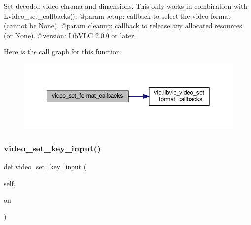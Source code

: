\begin{DoxyVerb}Set decoded video chroma and dimensions. This only works in combination with
L{video_set_callbacks}().
@param setup: callback to select the video format (cannot be None).
@param cleanup: callback to release any allocated resources (or None).
@version: LibVLC 2.0.0 or later.
\end{DoxyVerb}
 Here is the call graph for this function\+:
\nopagebreak
\begin{figure}[H]
\begin{center}
\leavevmode
\includegraphics[width=350pt]{classvlc_1_1_media_player_a4e34ac0318b11492555047b9d271a8d6_cgraph}
\end{center}
\end{figure}
\mbox{\label{classvlc_1_1_media_player_a1b21501a721f11e1adb9009442093707}} 
\subsubsection{\texorpdfstring{video\+\_\+set\+\_\+key\+\_\+input()}{video\_set\_key\_input()}}
{\footnotesize\ttfamily def video\+\_\+set\+\_\+key\+\_\+input (\begin{DoxyParamCaption}\item[{}]{self,  }\item[{}]{on }\end{DoxyParamCaption})}

